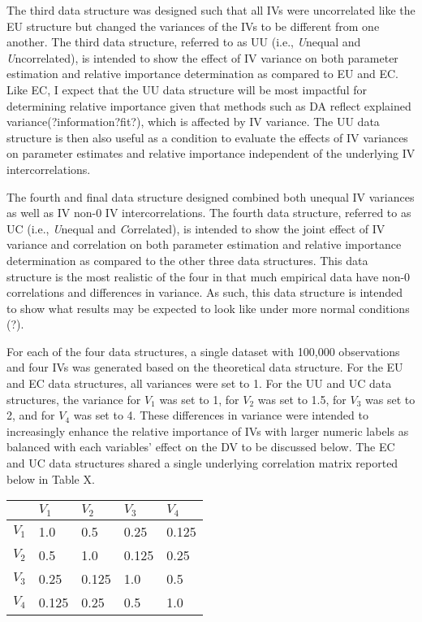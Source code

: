 \documentclass[ShortAfour,times,sageapa]{sagej}
\begin{document}
	The third data structure was designed such that all IVs were uncorrelated like the EU structure but changed the variances of the IVs to be different from one another.  
	The third data structure, referred to as UU (i.e., \emph{U}nequal and \emph{U}ncorrelated), is intended to show the effect of IV variance on both parameter estimation and relative importance determination as compared to EU and EC.
	Like EC, I expect that the UU data structure will be most impactful for determining relative importance given that methods such as DA reflect explained variance(?information?fit?), which is affected by IV variance. 
	The UU data structure is then also useful as a condition to evaluate the effects of IV variances on parameter estimates and relative importance independent of the underlying IV intercorrelations.
	
	The fourth and final data structure designed combined both unequal IV variances as well as IV non-0 IV intercorrelations.
	The fourth data structure, referred to as UC (i.e., \emph{U}nequal and \emph{C}orrelated), is intended to show the joint effect of IV variance and correlation on both parameter estimation and relative importance determination as compared to the other three data structures.
	This data structure is the most realistic of the four in that much empirical data have non-0 correlations and differences in variance.  
	As such, this data structure is intended to show what results may be expected to look like under more normal conditions (?).  
	
	For each of the four data structures, a single dataset with 100,000 observations and four IVs was generated based on the theoretical data structure.  
	For the EU and EC data structures, all variances were set to 1. For the UU and UC data structures, the variance for $V_{1}$ was set to 1, for $V_2$ was set to 1.5, for $V_3$ was set to 2, and for $V_4$ was set to 4. 
	These differences in variance were intended to increasingly enhance the relative importance of IVs with larger numeric labels as balanced with each variables' effect on the DV to be discussed below.  
	The EC and UC data structures shared a single underlying correlation matrix reported below in Table X.
	
	\smallskip
	
	\begin{center}
		\begin{tabular}[5]{r|llll}
			& $V_1$ & $V_2$ & $V_3$ & $V_4$ \\
			\toprule
			$V_1$ & 1.0 & 0.5 & 0.25 & 0.125 \\
			$V_2$ & 0.5 & 1.0 & 0.125 & 0.25 \\
			$V_3$ & 0.25 & 0.125 & 1.0 & 0.5 \\
			$V_4$ & 0.125 & 0.25 & 0.5 & 1.0
		\end{tabular}
	\end{center}
	
\end{document}
